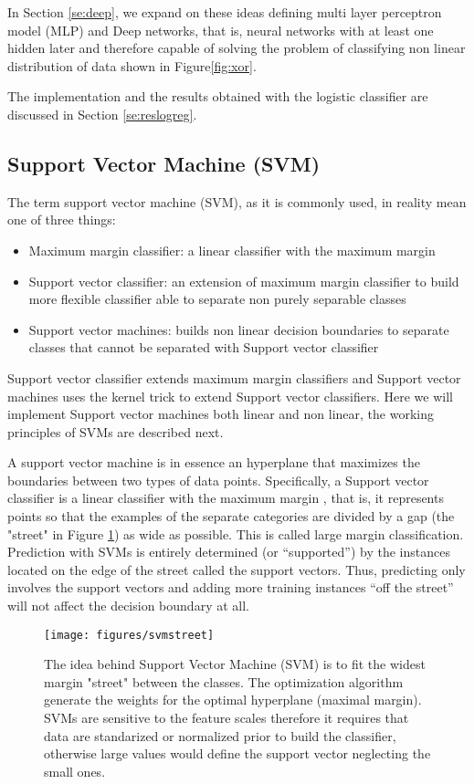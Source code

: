 \documentclass[11pt]{article}
\theoremstyle{definition}
\theoremstyle{remark}
\begin{document}
In Section \ref{se:deep}, we expand on these ideas defining multi layer perceptron model (MLP) and Deep networks, that is, neural networks with at least one hidden later and therefore capable of solving the problem of classifying non linear distribution of data shown in Figure\ref{fig:xor}.

The implementation and the results obtained with the logistic classifier are discussed in Section \ref{se:reslogreg}. 

\subsection{Support Vector Machine (SVM)}
\label{sse:svm}

The term support vector machine (SVM), as it is commonly used, in reality mean one of three things:
\begin{itemize}
	\item Maximum margin classifier: a linear classifier with the maximum margin 
	\item Support vector classifier: an extension of maximum margin classifier to build more flexible classifier able to separate  non purely separable classes 
	\item Support vector machines: builds non linear decision boundaries to separate classes that cannot be separated with Support vector classifier  
\end{itemize}
Support vector classifier extends maximum margin classifiers and Support vector machines uses the kernel trick to extend Support vector classifiers. Here we will implement Support vector machines both linear and non linear, the working principles of SVMs are described next.

A support vector machine is in essence an hyperplane that maximizes the boundaries between two types of data points. Specifically, a Support vector classifier is a linear classifier with the maximum margin \cite{vapnik2013nature}, that is, it represents points so that the examples of the separate categories are divided by a gap (the "street" in Figure \ref{fig:svmstreet}) as wide as possible. This is called large margin classification. 
Prediction with SVMs is entirely determined (or “supported”) by the instances located on the edge of the street called the support vectors. Thus, predicting only involves the support vectors and adding more training instances “off the street” will not affect the decision boundary at all. 

\begin{figure}[H]
        \centering
        \texttt{[image: figures/svmstreet]}
        \caption{The idea behind Support Vector Machine (SVM) is to fit the widest margin "street" between the classes. The optimization algorithm generate the weights for the optimal hyperplane (maximal margin). SVMs are sensitive to the feature scales therefore it requires that data are standarized or normalized prior to build the classifier, otherwise large values would define the support vector neglecting the small ones.
        } \label{fig:svmstreet} %
\end{figure}
\end{document}
